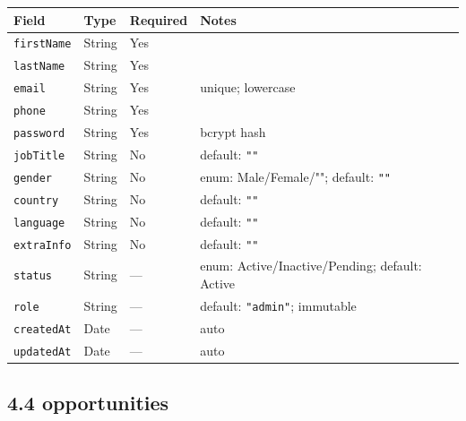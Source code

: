 \documentclass[12pt,a4paper]{article}
\begin{document}
\begin{longtable}{p{3.5cm}p{2.5cm}p{1.8cm}p{5.5cm}}
  \toprule
  \textbf{Field} & \textbf{Type} & \textbf{Required} & \textbf{Notes} \\
  \midrule
  \texttt{firstName}  & String & Yes & \\
  \texttt{lastName}   & String & Yes & \\
  \texttt{email}      & String & Yes & unique; lowercase \\
  \texttt{phone}      & String & Yes & \\
  \texttt{password}   & String & Yes & bcrypt hash \\
  \texttt{jobTitle}   & String & No  & default: \texttt{""} \\
  \texttt{gender}     & String & No  & enum: Male/Female/""; default: \texttt{""} \\
  \texttt{country}    & String & No  & default: \texttt{""} \\
  \texttt{language}   & String & No  & default: \texttt{""} \\
  \texttt{extraInfo}  & String & No  & default: \texttt{""} \\
  \texttt{status}     & String & — & enum: Active/Inactive/Pending; default: Active \\
  \texttt{role}       & String & — & default: \texttt{"admin"}; immutable \\
  \texttt{createdAt}  & Date   & — & auto \\
  \texttt{updatedAt}  & Date   & — & auto \\
  \bottomrule
\end{longtable}

\subsection*{4.4 opportunities}
\end{document}
